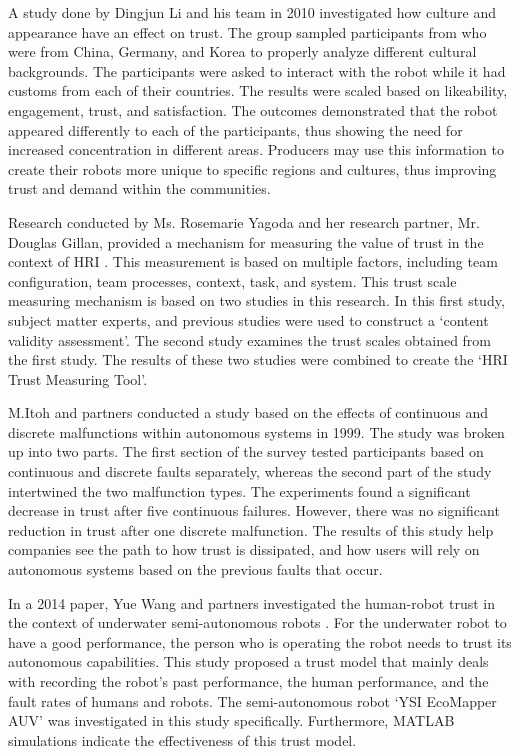 \documentclass[runningheads,a4paper]{llncs}
\begin{document}
A study done by Dingjun Li and his team in 2010 investigated how culture and appearance have an effect on trust\cite{li2010cross}.  The group sampled participants from who were from China, Germany, and Korea to properly analyze different cultural backgrounds.  The participants were asked to interact with the robot while it had customs from each of their countries.  The results were scaled based on likeability, engagement, trust, and satisfaction.  The outcomes demonstrated that the robot appeared differently to each of the participants, thus showing the need for increased concentration in different areas.  Producers may use this information to create their robots more unique to specific regions and cultures, thus improving trust and demand within the communities.

Research conducted by Ms. Rosemarie Yagoda and her research partner, Mr. Douglas Gillan, provided a mechanism for measuring the value of trust in the context of HRI \cite{yagoda2012you}. This measurement is based on multiple factors, including team configuration, team processes, context, task, and system. This trust scale measuring mechanism is based on two studies in this research. In this first study, subject matter experts, and previous studies were used to construct a `content validity assessment'. The second study examines the trust scales obtained from the first study. The results of these two studies were combined to create the `HRI Trust Measuring Tool'.


M.Itoh and partners conducted a study based on the effects of continuous and discrete malfunctions within autonomous systems in 1999\cite{itoh1999trust}. The study was broken up into two parts. The first section of the survey tested participants based on continuous and discrete faults separately, whereas the second part of the study intertwined the two malfunction types. The experiments found a significant decrease in trust after five continuous failures. However, there was no significant reduction in trust after one discrete malfunction. The results of this study help companies see the path to how trust is dissipated, and how users will rely on autonomous systems based on the previous faults that occur.

In a 2014 paper, Yue Wang and partners investigated the human-robot trust in the context of underwater semi-autonomous robots \cite{wang2014human}. For the underwater robot to have a good performance, the person who is operating the robot needs to trust its autonomous capabilities. This study proposed a trust model that mainly deals with recording the robot's past performance, the human performance, and the fault rates of humans and robots. The semi-autonomous robot `YSI EcoMapper AUV' was investigated in this study specifically. Furthermore, MATLAB simulations indicate the effectiveness of this trust model.
\end{document}
